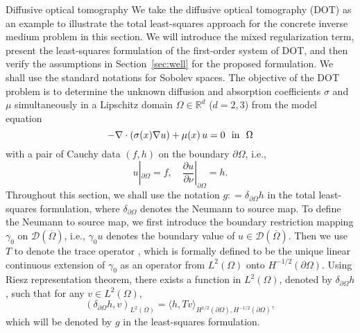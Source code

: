 \documentclass[11pt]{article}%
\renewcommand{\_}{{\fontfamily{ptm}\selectfont\textunderscore}}
\theoremstyle{plain}
\numberwithin{equation}{section}
\begin{document}
\begin{section}{Diffusive optical tomography}\label{sec:DOT}
  We take the diffusive optical tomography (DOT) as an example to illustrate the total least-squares approach for the concrete inverse medium problem in this section. We will introduce the mixed regularization term, present the least-squares formulation of the first-order system of DOT, and then verify the assumptions in Section~\ref{sec:well} for the proposed formulation. 
We shall use the standard notations for Sobolev spaces. 
The objective of the DOT problem is to determine the unknown diffusion and absorption coefficients $\sigma$ and $\mu$ 
 simultaneously in a Lipschitz domain $\Omega\in \mathbb{R}^d$ ($d=2,3$) from the model equation 
\begin{equation}\label{eq:dot}
-\nabla \cdot (\sigma(x) \nabla u)+\mu(x)\,u=0 ~~\mbox{in} ~~\Omega
\end{equation}
 with a pair of Cauchy data $(f,h)$ on the boundary $\partial\Omega$, i.e., 
\begin{equation*}
u|_{\partial\Omega}=f,\quad\frac{\partial u}{\partial \nu}|_{\partial\Omega}=h.
\end{equation*}
Throughout this section, we shall use the notation $g: = \delta_{\partial\Omega} h$ in the total least-squares formulation, where $\delta_{\partial \Omega}$ denotes the Neumann to source map. To define the Neumann to source map, we first introduce the  boundary restriction mapping  $\gamma_0$ on $\mathcal{D}(\overline{\Omega})$, i.e., 
$\gamma_0 u$ denotes the boundary value of $u\in \mathcal{D}(\overline{\Omega})$. Then we use  $T$ to denote the trace operator \cite{girault2012finite}, which is formally defined to be the unique linear continuous extension of $\gamma_0$ as an operator from $L^2(\Omega)$ onto $H^{-1/2}(\partial\Omega)$.  
Using Riesz representation theorem, there exists a function in $L^2(\Omega)$, denoted by $\delta_{\partial\Omega} h$, such that for any $v\in L^2(\Omega)$,
$$(\delta_{\partial\Omega} h, v)_{L^2(\Omega)} = \langle h, Tv\rangle_{H^{1/2}(\partial\Omega), H^{-1/2}(\partial\Omega)},$$
which will be denoted by $g$ in the least-squares formulation.

\end{section}
\end{document}

